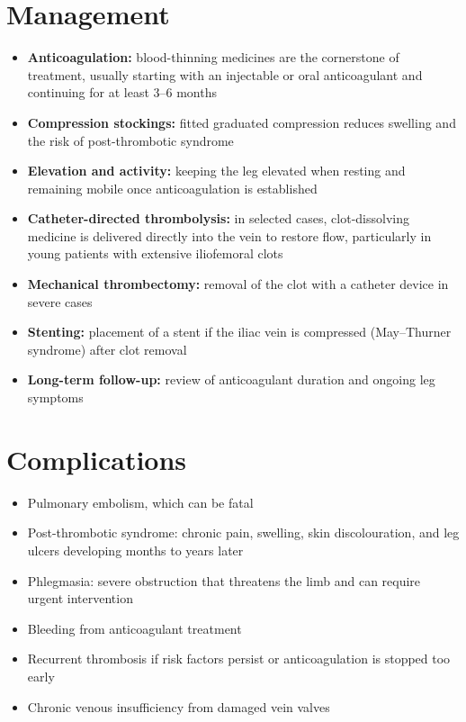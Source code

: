 \section*{Management}
\begin{itemize}
    \item \textbf{Anticoagulation:} blood-thinning medicines are the cornerstone of treatment, usually starting with an injectable or oral anticoagulant and continuing for at least 3--6 months
    \item \textbf{Compression stockings:} fitted graduated compression reduces swelling and the risk of post-thrombotic syndrome
    \item \textbf{Elevation and activity:} keeping the leg elevated when resting and remaining mobile once anticoagulation is established
    \item \textbf{Catheter-directed thrombolysis:} in selected cases, clot-dissolving medicine is delivered directly into the vein to restore flow, particularly in young patients with extensive iliofemoral clots
    \item \textbf{Mechanical thrombectomy:} removal of the clot with a catheter device in severe cases
    \item \textbf{Stenting:} placement of a stent if the iliac vein is compressed (May--Thurner syndrome) after clot removal
    \item \textbf{Long-term follow-up:} review of anticoagulant duration and ongoing leg symptoms
\end{itemize}

\section*{Complications}
\begin{itemize}
    \item Pulmonary embolism, which can be fatal
    \item Post-thrombotic syndrome: chronic pain, swelling, skin discolouration, and leg ulcers developing months to years later
    \item Phlegmasia: severe obstruction that threatens the limb and can require urgent intervention
    \item Bleeding from anticoagulant treatment
    \item Recurrent thrombosis if risk factors persist or anticoagulation is stopped too early
    \item Chronic venous insufficiency from damaged vein valves
\end{itemize}

